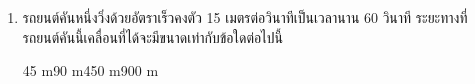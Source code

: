 \begin{enumerate}
	\item \runningj รถยนต์คันหนึ่งวิ่งด้วยอัตราเร็วคงตัว   15  เมตรต่อวินาทีเป็นเวลานาน  60  วินาที  	ระยะทางที่รถยนต์คันนี้เคลื่อนที่ได้จะมีขนาดเท่ากับข้อใดต่อไปนี้
	\begin{4c}
		{45 m}{90 m}{450 m}{900 m}
	\end{4c}
\end{enumerate}
